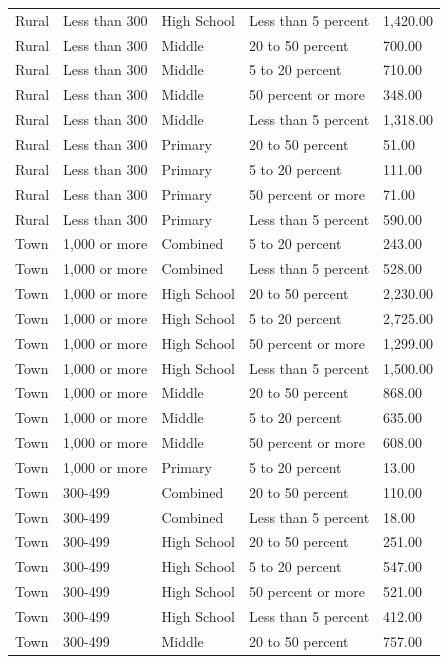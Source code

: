 \documentclass[man]{apa6}
\begin{document}
\begin{table}[tbp]
\begin{center}
\begin{threeparttable}
\begin{tabular}{lllll}
Rural & Less than 300 & High School & Less than 5 percent & 1,420.00\\
Rural & Less than 300 & Middle & 20 to 50 percent & 700.00\\
Rural & Less than 300 & Middle & 5 to 20 percent & 710.00\\
Rural & Less than 300 & Middle & 50 percent or more & 348.00\\
Rural & Less than 300 & Middle & Less than 5 percent & 1,318.00\\
Rural & Less than 300 & Primary & 20 to 50 percent & 51.00\\
Rural & Less than 300 & Primary & 5 to 20 percent & 111.00\\
Rural & Less than 300 & Primary & 50 percent or more & 71.00\\
Rural & Less than 300 & Primary & Less than 5 percent & 590.00\\
Town & 1,000 or more & Combined & 5 to 20 percent & 243.00\\
Town & 1,000 or more & Combined & Less than 5 percent & 528.00\\
Town & 1,000 or more & High School & 20 to 50 percent & 2,230.00\\
Town & 1,000 or more & High School & 5 to 20 percent & 2,725.00\\
Town & 1,000 or more & High School & 50 percent or more & 1,299.00\\
Town & 1,000 or more & High School & Less than 5 percent & 1,500.00\\
Town & 1,000 or more & Middle & 20 to 50 percent & 868.00\\
Town & 1,000 or more & Middle & 5 to 20 percent & 635.00\\
Town & 1,000 or more & Middle & 50 percent or more & 608.00\\
Town & 1,000 or more & Primary & 5 to 20 percent & 13.00\\
Town & 300-499 & Combined & 20 to 50 percent & 110.00\\
Town & 300-499 & Combined & Less than 5 percent & 18.00\\
Town & 300-499 & High School & 20 to 50 percent & 251.00\\
Town & 300-499 & High School & 5 to 20 percent & 547.00\\
Town & 300-499 & High School & 50 percent or more & 521.00\\
Town & 300-499 & High School & Less than 5 percent & 412.00\\
Town & 300-499 & Middle & 20 to 50 percent & 757.00\\

\end{tabular}
\end{threeparttable}
\end{center}
\end{table}
\end{document}

